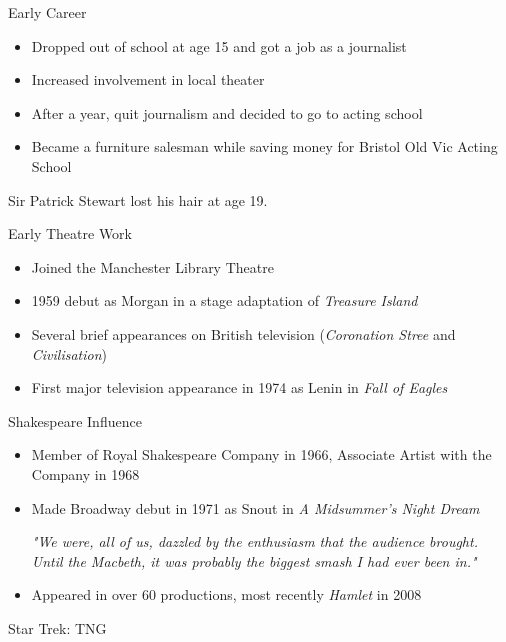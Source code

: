 \documentclass[xcolor=dvipsnames]{beamer}
\begin{document}
\begin{frame}{Early Career}
  \begin{itemize}
    \item Dropped out of school at age 15 and got a job as a journalist
    \item Increased involvement in local theater
    \item After a year, quit journalism and decided to go to acting school
    \item Became a furniture salesman while saving money for Bristol Old Vic
    Acting School
  \end{itemize}
  \begin{fct}
    Sir Patrick Stewart lost his hair at age 19.
  \end{fct}
\end{frame}

\begin{frame}{Early Theatre Work}
  \begin{itemize}
    \item Joined the Manchester Library Theatre
    \item 1959 debut as Morgan in a stage adaptation of \emph{Treasure Island}
    \item Several brief appearances on British television (\emph{Coronation
    Stree} and \emph{Civilisation})
    \item First major television appearance in 1974 as Lenin in \emph{Fall of Eagles}
  \end{itemize}
\end{frame}

\begin{frame}{Shakespeare Influence}
  \begin{itemize}
    \item Member of Royal Shakespeare Company in 1966, Associate Artist with the Company in 1968
    \item Made Broadway debut in 1971 as Snout in \emph{A Midsummer's Night Dream}
    \begin{qct}
      \emph{"We were, all of us, dazzled by the enthusiasm that the audience
      brought. Until the Macbeth, it was probably the biggest smash I had ever
      been in."}
    \end{qct}
    \item Appeared in over 60 productions, most recently \emph{Hamlet} in 2008
  \end{itemize}
\end{frame}

\begin{frame}{Star Trek: TNG}

\end{frame}
\end{document}
